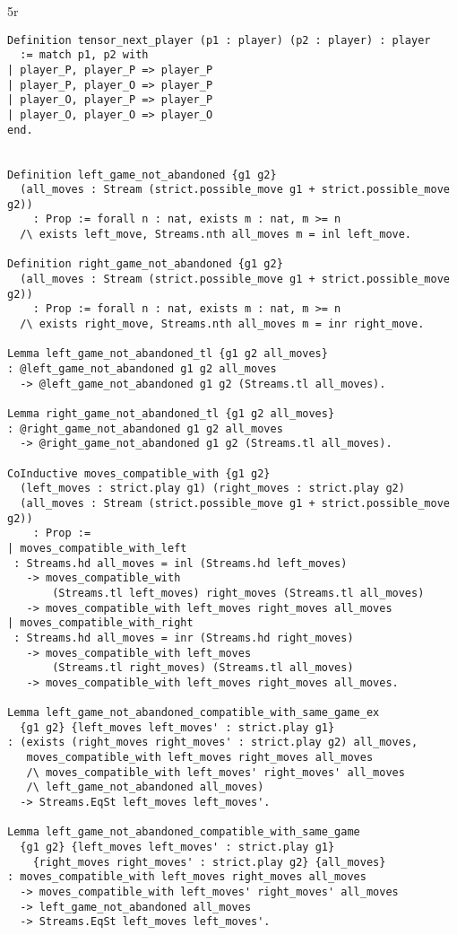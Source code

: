 5r\documentclass{article}
\theoremstyle{definition}
\begin{document}
\begin{verbatim}
Definition tensor_next_player (p1 : player) (p2 : player) : player 
  := match p1, p2 with
| player_P, player_P => player_P
| player_P, player_O => player_P
| player_O, player_P => player_P
| player_O, player_O => player_O
end.

 
Definition left_game_not_abandoned {g1 g2}
  (all_moves : Stream (strict.possible_move g1 + strict.possible_move g2)) 
    : Prop := forall n : nat, exists m : nat, m >= n 
  /\ exists left_move, Streams.nth all_moves m = inl left_move. 

Definition right_game_not_abandoned {g1 g2} 
  (all_moves : Stream (strict.possible_move g1 + strict.possible_move g2)) 
    : Prop := forall n : nat, exists m : nat, m >= n 
  /\ exists right_move, Streams.nth all_moves m = inr right_move. 

Lemma left_game_not_abandoned_tl {g1 g2 all_moves}
: @left_game_not_abandoned g1 g2 all_moves
  -> @left_game_not_abandoned g1 g2 (Streams.tl all_moves).
  
Lemma right_game_not_abandoned_tl {g1 g2 all_moves}
: @right_game_not_abandoned g1 g2 all_moves 
  -> @right_game_not_abandoned g1 g2 (Streams.tl all_moves).

CoInductive moves_compatible_with {g1 g2}
  (left_moves : strict.play g1) (right_moves : strict.play g2) 
  (all_moves : Stream (strict.possible_move g1 + strict.possible_move g2))
    : Prop :=
| moves_compatible_with_left
 : Streams.hd all_moves = inl (Streams.hd left_moves)
   -> moves_compatible_with 
       (Streams.tl left_moves) right_moves (Streams.tl all_moves)
   -> moves_compatible_with left_moves right_moves all_moves
| moves_compatible_with_right
 : Streams.hd all_moves = inr (Streams.hd right_moves)
   -> moves_compatible_with left_moves
       (Streams.tl right_moves) (Streams.tl all_moves)
   -> moves_compatible_with left_moves right_moves all_moves.

Lemma left_game_not_abandoned_compatible_with_same_game_ex
  {g1 g2} {left_moves left_moves' : strict.play g1}
: (exists (right_moves right_moves' : strict.play g2) all_moves,
   moves_compatible_with left_moves right_moves all_moves
   /\ moves_compatible_with left_moves' right_moves' all_moves
   /\ left_game_not_abandoned all_moves)
  -> Streams.EqSt left_moves left_moves'.
  
Lemma left_game_not_abandoned_compatible_with_same_game
  {g1 g2} {left_moves left_moves' : strict.play g1} 
    {right_moves right_moves' : strict.play g2} {all_moves}
: moves_compatible_with left_moves right_moves all_moves
  -> moves_compatible_with left_moves' right_moves' all_moves
  -> left_game_not_abandoned all_moves
  -> Streams.EqSt left_moves left_moves'.
  

\end{verbatim}
\end{document}
